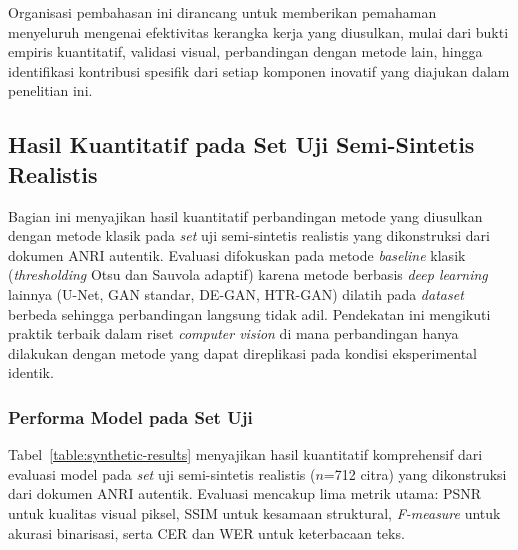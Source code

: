 \documentclass[12pt,a4paper]{article}
\begin{document}
\vspace{0.8em}

Organisasi pembahasan ini dirancang untuk memberikan pemahaman menyeluruh mengenai efektivitas kerangka kerja yang diusulkan, mulai dari bukti empiris kuantitatif, validasi visual, perbandingan dengan metode lain, hingga identifikasi kontribusi spesifik dari setiap komponen inovatif yang diajukan dalam penelitian ini.

\vspace{0.8em}

\subsection{Hasil Kuantitatif pada Set Uji Semi-Sintetis Realistis}
\label{subsec:hasil-kuantitatif}
\vspace{0.8em}

Bagian ini menyajikan hasil kuantitatif perbandingan metode yang diusulkan dengan metode klasik pada \textit{set} uji semi-sintetis realistis yang dikonstruksi dari dokumen ANRI autentik. Evaluasi difokuskan pada metode \textit{baseline} klasik (\textit{thresholding} Otsu dan Sauvola adaptif) karena metode berbasis \textit{deep learning} lainnya (U-Net, GAN standar, DE-GAN, HTR-GAN) dilatih pada \textit{dataset} berbeda sehingga perbandingan langsung tidak adil. Pendekatan ini mengikuti praktik terbaik dalam riset \textit{computer vision} di mana perbandingan hanya dilakukan dengan metode yang dapat direplikasi pada kondisi eksperimental identik.

\subsubsection{Performa Model pada Set Uji}
\label{subsubsec:performa-set-uji}

Tabel~\ref{table:synthetic-results} menyajikan hasil kuantitatif komprehensif dari evaluasi model pada \textit{set} uji semi-sintetis realistis ($n$=712 citra) yang dikonstruksi dari dokumen ANRI autentik. Evaluasi mencakup lima metrik utama: PSNR untuk kualitas visual piksel, SSIM untuk kesamaan struktural, \textit{F-measure} untuk akurasi binarisasi, serta CER dan WER untuk keterbacaan teks.
\end{document}
